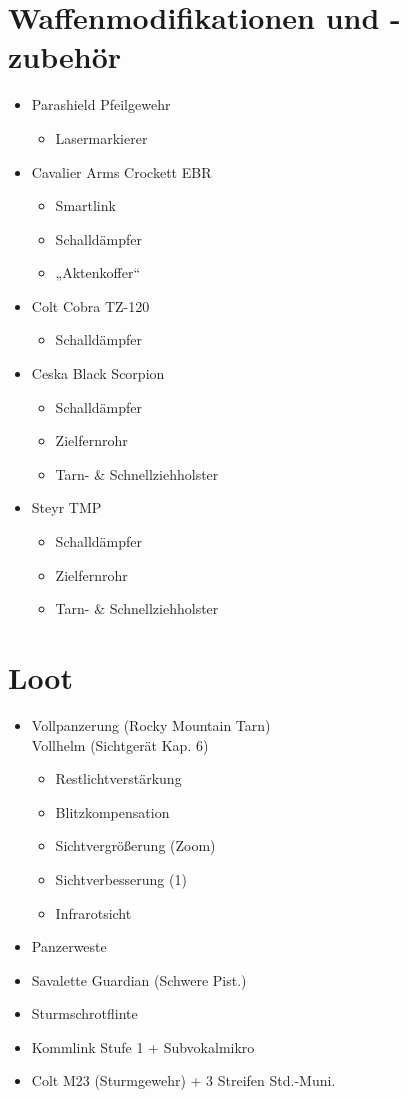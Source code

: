 {\begin{multicols}{2}
\section*{Waffenmodifikationen und -zubehör}
\begin{itemize}
	\item Parashield Pfeilgewehr
		\begin{itemize}
			\item  Lasermarkierer
		\end{itemize}
	\item Cavalier Arms Crockett EBR
		\begin{itemize}
			\item Smartlink
			\item Schalldämpfer
			\item „Aktenkoffer“
		\end{itemize}
	\item Colt Cobra TZ-120
		\begin{itemize}
			\item Schalldämpfer
		\end{itemize}
	\item Ceska Black Scorpion
		\begin{itemize}
			\item Schalldämpfer
			\item Zielfernrohr
			\item Tarn- \& Schnellziehholster
		\end{itemize}
	\item Steyr TMP
		\begin{itemize}
			\item Schalldämpfer
			\item Zielfernrohr
			\item Tarn- \& Schnellziehholster
		\end{itemize}
\end{itemize}


\section*{Loot}
\begin{itemize}
	\item Vollpanzerung  (Rocky Mountain Tarn)\\
		Vollhelm (Sichtgerät Kap. 6)
		\begin{itemize}
			\item Restlichtverstärkung
			\item Blitzkompensation
			\item Sichtvergrößerung (Zoom)
			\item Sichtverbesserung (1)
			\item Infrarotsicht
		\end{itemize}
	\item Panzerweste
	\item Savalette Guardian (Schwere Pist.)
	\item Sturmschrotflinte
	\item Kommlink Stufe 1 + Subvokalmikro
	\item Colt M23 (Sturmgewehr) + 3 Streifen Std.-Muni.
\end{itemize}
\vphantom{2cm}


\end{multicols}}
